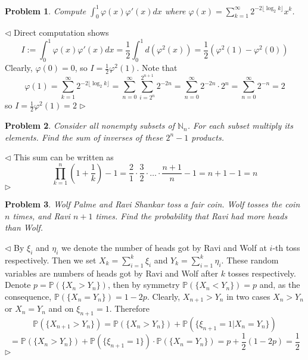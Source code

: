 \documentclass[12pt]{article}
\newtheorem{problem}{Problem}[subsection]
\newenvironment{solution}{\par $\triangleleft$}{$\triangleright$}
\begin{document}
\begin{problem} Compute $\int_0^1 \varphi(x)\varphi'(x)dx$ where
$\varphi(x)=\sum_{k=1}^\infty2^{-2\lfloor \log_2k\rfloor} x^k$.
\end{problem}
\begin{solution} Direct computation shows
    $$
        I:=\int_0^1 \varphi(x)\varphi'(x)dx
        =\frac{1}{2}\int_0^1 d(\varphi^2(x))
        =\frac{1}{2}(\varphi^2(1)-\varphi^2(0))
    $$
    Clearly, $\varphi(0)=0$, so $I=\frac{1}{2}\varphi^2(1)$. Note that
    $$
        \varphi(1)
        =\sum_{k=1}^\infty2^{-2\lfloor \log_2k\rfloor}
        =\sum_{n=0}^\infty\sum_{i=2^n}^{2^{n+1}} 2^{-2n}
        =\sum_{n=0}^\infty 2^{-2n}\cdot 2^n
        =\sum_{n=0}^\infty 2^{-n}
        =2
    $$
    so $I=\frac{1}{2}\varphi^2(1)=2$
\end{solution}

\begin{problem} Consider all nonempty subsets of $\mathbb{N}_n$. For each subset
multiply its elements. Find the sum of inverses of these $2^n-1$ products.
\end{problem}
\begin{solution} This sum can be written as
    $$
        \prod_{k=1}^n\left(1+\frac{1}{k}\right)-1
        =\frac{2}{1}\cdot\frac{3}{2}\cdot
        \ldots
        \cdot\frac{n+1}{n}-1=n+1-1=n
    $$
\end{solution}

\begin{problem} Wolf Palme and Ravi Shankar toss a fair coin. Wolf tosses the
coin $n$ times, and Ravi $n+1$ times. Find the probability that Ravi had more
heads than Wolf.
\end{problem}
\begin{solution} By $\xi_i$ and $\eta_i$ we denote the number of heads got by
    Ravi and Wolf at $i$-th toss respectively. Then we set $X_k=\sum_{i=1}^k
        \xi_i$ and $Y_k=\sum_{i=1}^k \eta_i$. These random variables are numbers of
    heads got by Ravi and Wolf after $k$  tosses respectively. Denote
    $p=\mathbb{P}(\{X_n>Y_n\})$, then by symmetry $\mathbb{P}(\{X_n<Y_n\})=p$
    and, as the consequence, $\mathbb{P}(\{X_n=Y_n\})=1-2p$. Clearly,
    $X_{n+1}>Y_n$ in two cases $X_n>Y_n$ or $X_n=Y_n$ and on $\xi_{n+1}=1$.
    Therefore
    $$
        \mathbb{P}(\{X_{n+1}>Y_n\})
        =\mathbb{P}(\{X_n>Y_n\})+\mathbb{P}(\{\xi_{n+1}=1|X_n=Y_n\})
    $$
    $$
        =\mathbb{P}(\{X_n>Y_n\})+
        \mathbb{P}(\{\xi_{n+1}=1\})\cdot\mathbb{P}(\{X_n=Y_n\})
        =p+\frac{1}{2}(1-2p)=\frac{1}{2}
    $$
\end{solution}
\end{document}
